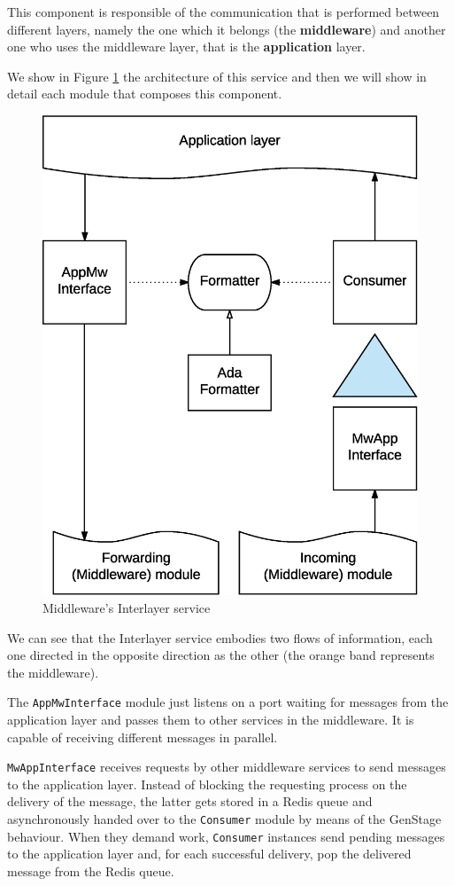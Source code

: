 
This component is responsible of the communication that is performed between
different layers, namely the one which it belongs (the \textbf{middleware}) and
another one who uses the middleware layer, that is the \textbf{application}
layer.

We show in Figure \ref{fig:mw-interlayer} the architecture of this service and
then we will show in detail each module that composes this component.

\begin{figure}[H]
  \centering
  \includegraphics[width=.8\columnwidth]{images/solution/mw/int/architect.eps}
  \caption{Middleware's Interlayer service}
  \label{fig:mw-interlayer}
\end{figure}

We can see that the Interlayer service embodies two flows of information, each
one directed in the opposite direction as the other (the orange band represents
the middleware).

The \texttt{AppMwInterface} module just listens on a port waiting for messages
from the application layer and passes them to other services in the middleware.
It is capable of receiving different messages in parallel.

\texttt{MwAppInterface} receives requests by other middleware services to send
messages to the application layer. Instead of blocking the requesting process
on the delivery of the message, the latter gets stored in a Redis queue and
asynchronously handed over to the \texttt{Consumer} module by means of the
GenStage behaviour. When they demand work, \texttt{Consumer} instances send
pending messages to the application layer and, for each successful delivery,
pop the delivered message from the Redis queue.


